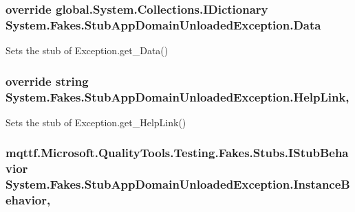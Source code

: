 \hypertarget{class_system_1_1_fakes_1_1_stub_app_domain_unloaded_exception_a59f00cc28c40d9ef141a63a4f577d995}{
\subsubsection[{Data}]{\setlength{\rightskip}{0pt plus 5cm}override global.\-System.\-Collections.\-I\-Dictionary System.\-Fakes.\-Stub\-App\-Domain\-Unloaded\-Exception.\-Data\hspace{0.3cm}{\ttfamily [get]}}}\label{class_system_1_1_fakes_1_1_stub_app_domain_unloaded_exception_a59f00cc28c40d9ef141a63a4f577d995}


Sets the stub of Exception.\-get\-\_\-\-Data()

\hypertarget{class_system_1_1_fakes_1_1_stub_app_domain_unloaded_exception_aad1ab4f4488f9e8c5c105fb56f35f716}{
\subsubsection[{Help\-Link}]{\setlength{\rightskip}{0pt plus 5cm}override string System.\-Fakes.\-Stub\-App\-Domain\-Unloaded\-Exception.\-Help\-Link\hspace{0.3cm}{\ttfamily [get]}, {\ttfamily [set]}}}\label{class_system_1_1_fakes_1_1_stub_app_domain_unloaded_exception_aad1ab4f4488f9e8c5c105fb56f35f716}


Sets the stub of Exception.\-get\-\_\-\-Help\-Link()

\hypertarget{class_system_1_1_fakes_1_1_stub_app_domain_unloaded_exception_a55bd43528c03ad70b22a8658956959c7}{
\subsubsection[{Instance\-Behavior}]{\setlength{\rightskip}{0pt plus 5cm}mqttf.\-Microsoft.\-Quality\-Tools.\-Testing.\-Fakes.\-Stubs.\-I\-Stub\-Behavior System.\-Fakes.\-Stub\-App\-Domain\-Unloaded\-Exception.\-Instance\-Behavior\hspace{0.3cm}{\ttfamily [get]}, {\ttfamily [set]}}}\label{class_system_1_1_fakes_1_1_stub_app_domain_unloaded_exception_a55bd43528c03ad70b22a8658956959c7}


